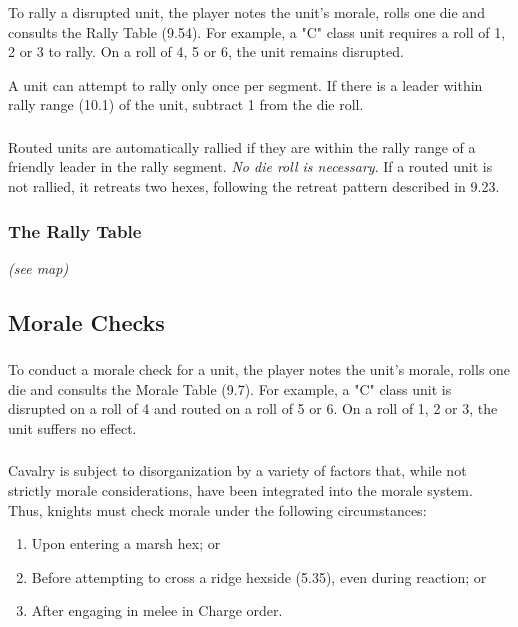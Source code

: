 \subsubsection[How to Rally]{} To rally a disrupted unit, the player notes the unit's morale, rolls one die and consults the Rally Table (9.54). For example, a "C" class unit requires a roll of 1, 2 or 3 to rally. On a roll of 4, 5 or 6, the unit remains disrupted.

A unit can attempt to rally only once per segment. If there is a leader within rally range (10.1) of the unit, subtract 1 from the die roll.

\subsubsection[Routed Units]{} Routed units are automatically rallied if they are within the rally range of a friendly leader in the rally segment. \textit{No die roll is necessary}. If a routed unit is not rallied, it retreats two hexes, following the retreat pattern described in 9.23.

\subsubsection{The Rally Table} \textit{(see map)}

\subsection{Morale Checks}

\subsubsection[Conducting Morale Checks]{} To conduct a morale check for a unit, the player notes the unit's morale, rolls one die and consults the Morale Table (9.7). For example, a "C" class unit is disrupted on a roll of 4 and routed on a roll of 5 or 6. On a roll of 1, 2 or 3, the unit suffers no effect.

\subsubsection[Cavalry]{} Cavalry is subject to disorganization by a variety of factors that, while not strictly morale considerations, have been integrated into the morale system. Thus, knights must check morale under the following circumstances:

\begin{enumerate}
  \item Upon entering a marsh hex; or
  \item Before attempting to cross a ridge hexside (5.35), even during reaction; or
  \item After engaging in melee in Charge order.
\end{enumerate}

